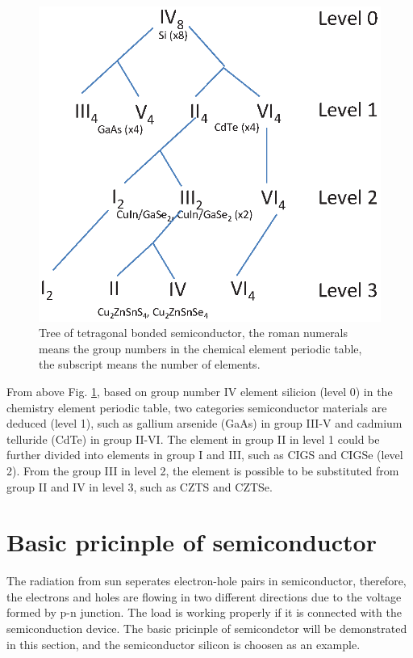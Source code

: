 \documentclass[a4paper, 12pt, titlepage,oneside,drop]{kthesis}
\begin{document}
\begin{figure}[H]
\centering
\includegraphics[scale=0.8]{compoundsemicondctor1} 
\caption{Tree of tetragonal bonded semiconductor, the roman numerals means the group numbers in the chemical element periodic table, the subscript means the number of elements.}
\label{lscm}
\end{figure}


From above Fig. \ref{lscm}, based on group number IV element silicion (level 0) in the chemistry element periodic table, two categories semiconductor materials are deduced (level 1), such as gallium arsenide (GaAs) in group III-V and cadmium telluride (CdTe)
in group II-VI. The element in group II in level 1 could be further divided into elements in group I and III, such as CIGS and CIGSe (level 2). From the group III in level 2, the element is possible to
be substituted from group II and IV in level 3, such as CZTS and CZTSe.



\section{Basic pricinple of semiconductor}

The radiation from sun seperates electron-hole pairs in semiconductor, therefore, the electrons and holes are flowing in two different directions due to 
the voltage formed by p-n junction. The load is working properly if it is connected with the semiconduction device. The basic pricinple of semicondctor
will be demonstrated in this section, and the semiconductor silicon is choosen as an example. 
\end{document}
